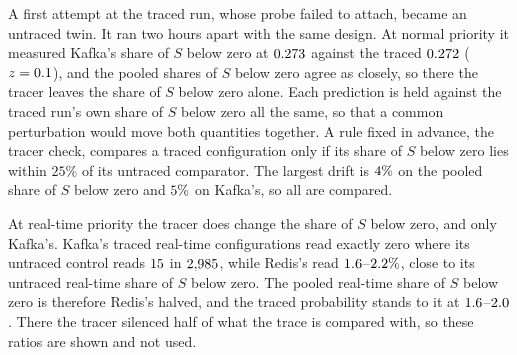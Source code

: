 \documentclass[10pt,journal,onecolumn]{IEEEtran}
\newcommand{\kafka}{Kafka}
\newcommand{\redis}{Redis}
\begin{document}
\begin{table}[tb]
\caption{\textbf{Pooled, the trace stays within a factor of three of the share of $S$ below zero at every threshold;
at \redis{}'s own margin it reaches $\tracedRedisMarginRatioHi\times$.} The share of traced waits
for a core longer than each threshold over the share of $S$ below zero of the same runs, at normal
priority: both brokers' threads against the pooled share of $S$ below zero, then each broker at its own margin $m$
against its own share of $S$ below zero. The trace's buckets are powers of two in microseconds. Generated at build
time from the trace histograms and the campaign files.}
\label{stab:tracethreshold}
\centering
\footnotesize

\end{table}

A first attempt at the traced run, whose probe failed to attach, became an untraced twin. It ran
two hours apart with the same design. At normal priority it measured \kafka{}'s share of $S$ below zero at
$0.273$ against the traced $0.272$ ($z=0.1$), and the pooled shares of $S$ below zero agree as
closely, so there the tracer leaves the share of $S$ below zero alone. Each prediction is held against the traced
run's own share of $S$ below zero all the same, so that a common perturbation would move both quantities together. A
rule fixed in advance, the tracer check, compares a traced configuration only if its share of $S$ below zero lies
within $25\%$ of its untraced comparator. The largest drift is $4\%$ on the
pooled share of $S$ below zero and $5\%$ on \kafka{}'s, so all \tracedPooledWord{} are
compared.

At real-time priority the tracer does change the share of $S$ below zero, and only \kafka{}'s.
\kafka{}'s traced real-time configurations read exactly zero where its untraced control reads
$15$ in $2{,}985$, while \redis{}'s read
$1.6$--$2.2\%$, close to its untraced real-time share of $S$ below zero. The pooled
real-time share of $S$ below zero is therefore \redis{}'s halved, and the traced probability stands to it at
$1.6$--$2.0$. There the tracer silenced half of what the
trace is compared with, so these ratios are shown and not used.
\end{document}
